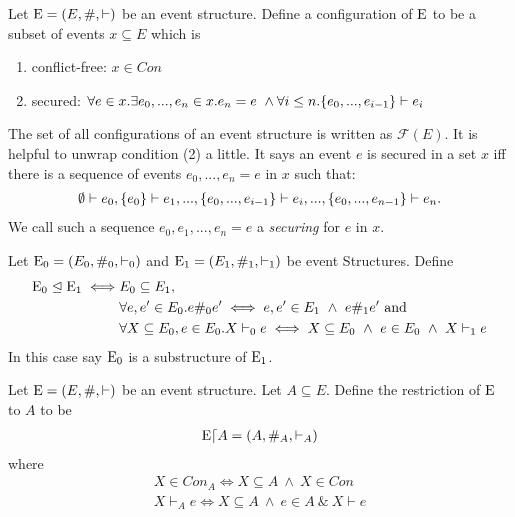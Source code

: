 \begin{definition}[Configuration]
    \label{conf}
    Let $\mathrm{E} = (E,\#,\vdash)$ be an event structure.
    Define a configuration of $\mathrm{E}$ to be a subset of events $x \subseteq E$ which is
    \begin{enumerate}
        \item conflict-free: $x \in Con$
        \item secured: $\forall e \in x. \exists e_0,...,e_n \in x. e_n = e \ \wedge
                  \forall i \leq n. \{e_0,...,e_{i-1}\} \vdash e_i$
    \end{enumerate}
\end{definition}
\noindent The set of all configurations of an event structure is written as $\mathcal{F}(E)$.
It is helpful to unwrap condition (2) a little. It says an event $e$ is secured in a set $x$
iff there is a sequence of events $e_0,...,e_n = e$ in $x$ such that:
\begin{align*}
    \emptyset \vdash e_0, \{e_0\} \vdash e_1, ..., \{e_0,...,e_{i-1}\} \vdash e_i,...,
    \{e_0,...,e_{n-1}\} \vdash e_n.
\end{align*}
We call such a sequence $e_0,e_1,...,e_n = e$ a \emph{securing} for $e$ in $x$.

\begin{definition}
    Let $\mathrm{E_0} = (E_0,\#_0,\vdash_0)$ and $\mathrm{E_1} = (E_1,\#_1,\vdash_1)$
    be event Structures. Define
    \begin{align*}
        \mathrm{E_0} \trianglelefteq \mathrm{E_1} \iff
         & E_0 \subseteq E_1,                            \\
         & \forall e,e' \in E_0. e\#_0e'  \iff e,e' \in E_1
        \ \wedge \ e\#_1 e' \text{ and }                 \\
         & \forall X \subseteq E_0,e \in E_0.X\vdash_0 e  \iff X \subseteq E_0
        \ \wedge \ e \in E_0\ \wedge \ X \vdash_1 e
    \end{align*}
    In this case say $\mathrm{E_0}$ is a substructure of $\mathrm{E_1}$.
\end{definition}

\begin{definition}[Restriction]
    Let $\mathrm{E} = (E,\#,\vdash)$ be an event structure.
    Let $A \subseteq E$.
    Define the restriction of $\mathrm{E}$ to $A$ to be
    \begin{align*}
        \mathrm{E} \lceil A = (A,\#_A,\vdash_A)
    \end{align*}
    where
    \begin{align*}
        X \in Con_A \iff X \subseteq A \ \wedge \ X \in Con \\
        X \vdash_A e \iff X \subseteq A \ \wedge \ e \in A \ \& \ X \vdash e
    \end{align*}
\end{definition}

